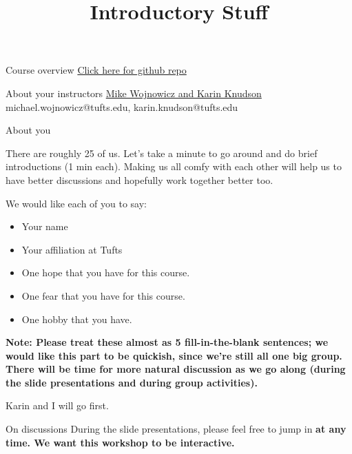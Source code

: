 \documentclass[10pt]{beamer}
\title{Introductory Stuff}
\begin{document}
\maketitle


\begin{frame}{Course overview}
\href{https://github.com/mikewojnowicz/bayesian_modeling/}{Click here for github repo}
\end{frame}

\begin{frame}{About your instructors}
\href{https://disc.tufts.edu/people}{Mike Wojnowicz and Karin Knudson}
\vfill
michael.wojnowicz@tufts.edu, karin.knudson@tufts.edu
\end{frame}
 
\begin{frame}{About you}

There are roughly 25 of us.  Let's take a minute to go around and do brief introductions (1 min each).  Making us all comfy with each other will help us to  have better discussions and hopefully work together better too.

\vfill

We would like each of you to say: 
\begin{itemize}
\item Your name
\item Your affiliation at Tufts
\item One hope that you have for this course.
\item One fear that you have for this course.
\item One hobby that you have.
\end{itemize}

\bf{Note:} Please treat these almost as 5 fill-in-the-blank sentences; we would like this part to be quickish, since we're still all one big group.   There will be time for more natural discussion as we go along (during the slide presentations and during group activities). 
\vfill

Karin and I will go first.
 
\end{frame}

\begin{frame}{On discussions}
During the slide presentations, please feel free to jump in \bf{at any time}.  We want this workshop to be interactive. 
\end{frame}
\end{document}
